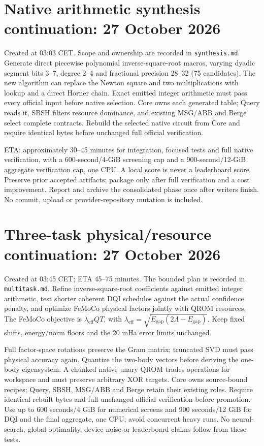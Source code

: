 \documentclass{article}
\begin{document}
\section*{Native arithmetic synthesis continuation: 27 October 2026}
Created at 03:03 CET. Scope and ownership are recorded in \texttt{synthesis.md}.
Generate direct piecewise polynomial inverse-square-root macros, varying dyadic
segment bits 3--7, degree 2--4 and fractional precision 28--32 (75 candidates).
The new algorithm can replace the Newton square and two multiplications with
lookup and a direct Horner chain. Exact emitted integer arithmetic must pass
every official input before native selection. Core owns each generated table;
Query reads it, SBSH filters resource dominance, and existing MSG/ABB and Berge
select complete contracts. Rebuild the selected native circuit from Core and
require identical bytes before unchanged full official verification.

ETA: approximately 30--45 minutes for integration, focused tests and full native
verification, with a 600-second/4-GiB screening cap and a 900-second/12-GiB
aggregate verification cap, one CPU. A local score is never a leaderboard score.
Preserve prior accepted artifacts; package only after full verification and a
cost improvement. Report and archive the consolidated phase once after writers
finish. No commit, upload or provider-repository mutation is included.
\section*{Three-task physical/resource continuation: 27 October 2026}
Created at 03:45 CET; ETA 45--75 minutes. The bounded plan is recorded in
\texttt{multitask.md}. Refine inverse-square-root coefficients against emitted
integer arithmetic, test shorter coherent DQI schedules against the actual
confidence penalty, and optimize FeMoCo physical factors jointly with QROM
resources. The FeMoCo objective is
$\lambda_{\mathrm{eff}} Q T$, with
$\lambda_{\mathrm{eff}}=\sqrt{E_{\mathrm{gap}}(2\Lambda-E_{\mathrm{gap}})}$.
Keep fixed shifts, energy/norm floors and the 20 mHa error limits unchanged.

Full factor-space rotations preserve the Gram matrix; truncated SVD must pass
physical accuracy again. Quantize the two-body vectors before deriving the
one-body eigensystem. A chunked native unary QROM trades operations for workspace
and must preserve arbitrary XOR targets. Core owns source-bound recipes; Query,
SBSH, MSG/ABB and Berge retain their existing roles. Require identical rebuilt
bytes and full unchanged official verification before promotion. Use up to
600 seconds/4 GiB for numerical screens and 900 seconds/12 GiB for DQI and the
final aggregate, one CPU; avoid concurrent heavy runs. No neural-search,
global-optimality, device-noise or leaderboard claims follow from these tests.
\end{document}
